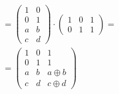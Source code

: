 \[\begin{array}{l}
{= {\begin{pmatrix}
1 & 0 \\
0 & 1 \\
a & b \\
c & d
\end{pmatrix} \cdot \begin{pmatrix}
1 & 0 & 1 \\
0 & 1 & 1
\end{pmatrix}} =} \\
{= \begin{pmatrix}
1 & 0 & 1 \\
0 & 1 & 1 \\
a & b & {a\oplus b} \\
c & d & {c\oplus d}
\end{pmatrix}}
\end{array}\]

